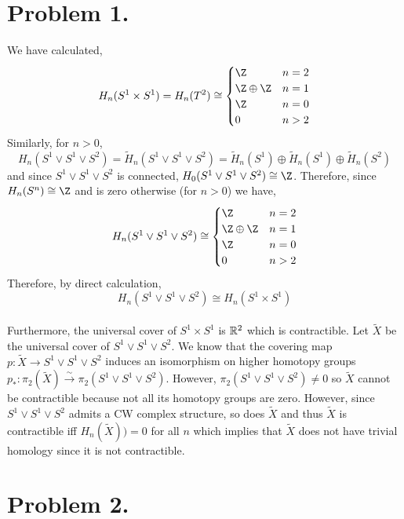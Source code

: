 \documentclass[12pt]{extarticle}
\begin{document}
 
\section*{Problem 1.}

We have calculated,
\[ H_n(S^1 \times S^1) = H_n(T^2) \cong
\begin{cases}
\Z & n = 2 \\
\Z \oplus \Z & n = 1\\
\Z & n = 0 \\
0 & n > 2
\end{cases} \]
Similarly, for $n > 0$,
\[ H_n(S^1 \vee S^1 \vee S^2) = \tilde{H}_n(S^1 \vee S^1 \vee S^2) = \tilde{H}_n(S^1) \oplus \tilde{H}_n(S^1) \oplus \tilde{H}_n(S^2) \]
and since $S^1 \vee S^1 \vee S^2$ is connected, $H_0(S^1 \vee S^1 \vee S^2) \cong \Z$. Therefore,
since $H_n(S^n) \cong \Z$ and is zero otherwise (for $n > 0$) we have,
\[ H_n(S^1 \vee S^1 \vee S^2) \cong
\begin{cases}
\Z & n = 2 \\
\Z \oplus \Z & n = 1\\
\Z & n = 0 \\
0 & n > 2
\end{cases} \]
Therefore, by direct calculation,
\[ H_n(S^1 \vee S^1 \vee S^2) \cong H_n(S^1 \times S^1) \]
\bigskip\\
Furthermore, the universal cover of $S^1 \times S^1$ is $\mathbb{R}^2$ which is contractible. Let $\tilde{X}$ be the universal cover of $S^1 \vee S^1 \vee S^2$. We know that the covering map $p : \tilde{X} \to S^1 \vee S^1 \vee S^2$ induces an isomorphism on higher homotopy groups $p_* : \pi_2(\tilde{X}) \xrightarrow{\sim} \pi_2(S^1 \vee S^1 \vee S^2)$. However, $\pi_2(S^1 \vee S^1 \vee S^2) \neq 0$ so $\tilde{X}$ cannot be contractible because not all its homotopy groups are zero. However, since $S^1 \vee S^1 \vee S^2$ admits a CW complex structure, so does $\tilde{X}$ and thus $\tilde{X}$ is contractible iff $H_n(\tilde{X})) = 0$ for all $n$ which implies that $\tilde{X}$ does not have trivial homology since it is not contractible. 

\section*{Problem 2.}
\end{document}

